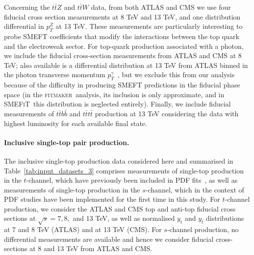 \documentclass[withindex,glossary]{cam-thesis}
\newcommand{\fitm}{\textsc{fitmaker}}
\newcommand{\smefit}{\textsc{SMEFiT}}
\begin{document}
Concerning the $t\bar{t}Z$ and $t\bar{t}W$ data,
from both ATLAS and CMS we use four fiducial cross section measurements at 8 TeV
and 13 TeV,
and one distribution differential in $p_T^Z$ at 13 TeV.
%
These measurements are particularly interesting to probe SMEFT coefficients that
modify the interactions between the top quark and the electroweak sector.
%
For top-quark production associated with a photon, we include the fiducial
cross-section measurements from ATLAS and CMS at 8 TeV; also available is a
differential distribution at 13 TeV from ATLAS binned in the photon transverse
momentum $p_T^\gamma$~\cite{Aad:2020axn}, but we exclude this from our analysis because of the difficulty in
producing SMEFT predictions in the fiducial phase space (in the \fitm{}~analysis, its inclusion
is only approximate, and in \smefit{}~this distribution is neglected entirely).
%
Finally, we include fiducial measurements of
$t\bar{t}b\bar{b}$ and $t\bar{t}t\bar{t}$ production at 13 TeV considering
the data with highest luminosity for each available final state.
%

\paragraph{Inclusive single-top pair production.}
%
The inclusive single-top production data considered here
and summarised in Table~\ref{tab:input_datasets_3}
comprises measurements of
single-top production in the $t$-channel, which have previously been included
in PDF fits~\cite{Nocera:2019wyk,NNPDF:2021njg}, as well as measurements of single-top production in the $s$-channel, which in the context of PDF studies have been implemented for the first time in this study.
%
For $t$-channel production, we consider the ATLAS and CMS top and anti-top fiducial cross sections at
$\sqrt{s}=7,8,$ and 13 TeV, as well as normalised $y_t$ and $y_{\bar{t}}$ distributions
at 7 and 8 TeV (ATLAS) and at 13 TeV (CMS).
%
For  $s$-channel production, no differential measurements are available and hence
we consider fiducial cross-sections at 8 and 13 TeV from ATLAS and CMS.


\end{document}
